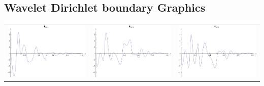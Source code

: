 \documentclass{article}
\begin{document}
\begin{landscape}
\subsection{Wavelet Dirichlet boundary Graphics}
\begin{tabular}{ccc}
\includegraphics[width=6.7cm]{biquadratic_wavelet_dleft_1.pdf}& \includegraphics[width=6.7cm]{biquadratic_wavelet_dleft_2.pdf}& \includegraphics[width=6.7cm]{biquadratic_wavelet_dleft_3.pdf} \\
\end{tabular} 
 \\ 
\begin{tabular}{cc}

\end{tabular}
\end{landscape}
\end{document}
